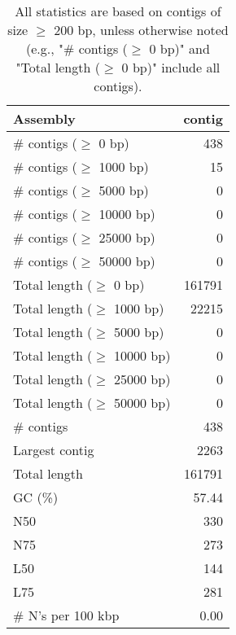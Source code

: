\documentclass[12pt,a4paper]{article}
\begin{document}
\begin{table}[ht]
\begin{center}
\caption{All statistics are based on contigs of size $\geq$ 200 bp, unless otherwise noted (e.g., "\# contigs ($\geq$ 0 bp)" and "Total length ($\geq$ 0 bp)" include all contigs).}
\begin{tabular}{|l*{1}{|r}|}
\hline
Assembly & contig \\ \hline
\# contigs ($\geq$ 0 bp) & 438 \\ \hline
\# contigs ($\geq$ 1000 bp) & 15 \\ \hline
\# contigs ($\geq$ 5000 bp) & 0 \\ \hline
\# contigs ($\geq$ 10000 bp) & 0 \\ \hline
\# contigs ($\geq$ 25000 bp) & 0 \\ \hline
\# contigs ($\geq$ 50000 bp) & 0 \\ \hline
Total length ($\geq$ 0 bp) & 161791 \\ \hline
Total length ($\geq$ 1000 bp) & 22215 \\ \hline
Total length ($\geq$ 5000 bp) & 0 \\ \hline
Total length ($\geq$ 10000 bp) & 0 \\ \hline
Total length ($\geq$ 25000 bp) & 0 \\ \hline
Total length ($\geq$ 50000 bp) & 0 \\ \hline
\# contigs & 438 \\ \hline
Largest contig & 2263 \\ \hline
Total length & 161791 \\ \hline
GC (\%) & 57.44 \\ \hline
N50 & 330 \\ \hline
N75 & 273 \\ \hline
L50 & 144 \\ \hline
L75 & 281 \\ \hline
\# N's per 100 kbp & 0.00 \\ \hline
\end{tabular}
\end{center}
\end{table}
\end{document}
